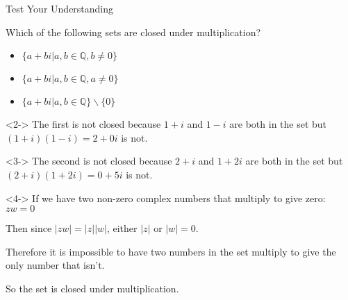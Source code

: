 \documentclass[8pt]{beamer}
\begin{document}
\begin{frame}{Test Your Understanding}
	\begin{problem}
	Which of the following sets are closed under multiplication?
	\begin{itemize}
		\item $\{a+bi|a,b \in \mathbb{Q}, b \neq 0\}$
		\item $\{a+bi|a,b \in \mathbb{Q}, a \neq 0\}$
	\item $\{a+bi|a,b \in \mathbb{Q}\}\backslash  \{0\}$
	\end{itemize}
\end{problem}

\begin{solution}<2->
	The first is not closed because $1+i$ and  $1-i$ are both in the set but  $(1+i)(1-i)=2+0i$ is not.
\end{solution}
\begin{solution}<3->
	The second is not closed because $2+i$ and $1+2i$ are both in the set but $(2+i)(1+2i)=0+5i$ is not.
\end{solution}
\begin{solution}<4->
	If we have two non-zero complex numbers that multiply to give zero: $zw=0$ 

	Then since $|zw|= |z | |w|$, either $|z| \text{ or } |w| =0$.

	Therefore it is impossible to have two numbers in the set multiply to give the only number that isn't.

	So the set is closed under multiplication.
\end{solution}

\end{frame}
\end{document}
